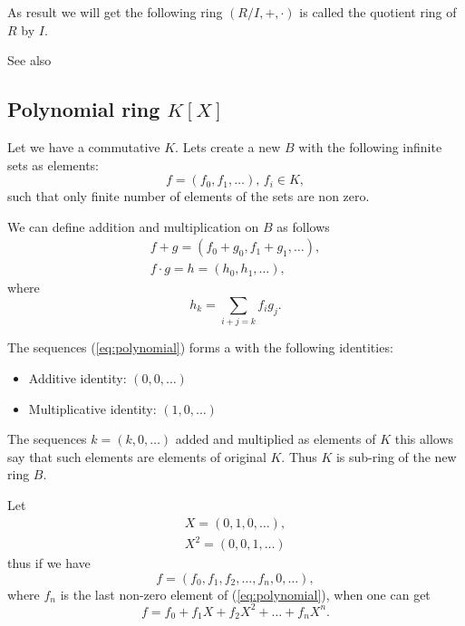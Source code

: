 \begin{appendices}
\begin{definition}
  As result we will get the following ring $\left(R/I, +,
  \cdot\right)$ is called the quotient ring of $R$ by $I$.

  See also 
  \label{def:quotientring}
\end{definition}

\subsection{Polynomial ring $K\left[X\right]$}

Let we have a commutative  $K$. Lets create a new
 $B$ with the following infinite sets as elements:
\begin{equation}
  f = \left(f_0, f_1, \dots \right), \, f_i \in K,
  \label{eq:polynomial}
\end{equation}
such that only finite number of elements of the sets are non zero.

We can define addition and multiplication on $B$ as follows
\begin{eqnarray}
  f + g = \left(f_0 + g_0, f_1 + g_1, \dots \right),
  \nonumber \\
  f \cdot g = h = \left(h_0, h_1, \dots \right),
  \label{eq:polynomialops}
\end{eqnarray}
where
\[
h_k = \sum_{i + j =k} f_i g_j. 
\]

The sequences (\ref{eq:polynomial}) forms a  with
the following identities:
\begin{itemize}
\item Additive identity: $\left(0, 0, \dots \right)$
\item Multiplicative identity: $\left(1, 0, \dots \right)$
\end{itemize}

The
sequences $k = \left(k, 0, \dots \right)$ added and multiplied as
elements of $K$ this allows say that such elements are elements of
original  $K$. Thus $K$ is sub-ring of the new ring
$B$.

Let
\begin{eqnarray}
  X = \left(0, 1, 0, \dots \right),
  \nonumber \\
  X^2 = \left(0, 0, 1, \dots \right)
  \nonumber
\end{eqnarray}
thus if we have
\[
f = \left(f_0, f_1, f_2, \dots, f_n, 0, \dots \right),
\]
where $f_n$ is the last non-zero element of (\ref{eq:polynomial}),
when one can get
\[
f = f_0 + f_1 X + f_2 X^2 + \dots + f_n X^n.
\]


\end{appendices}
